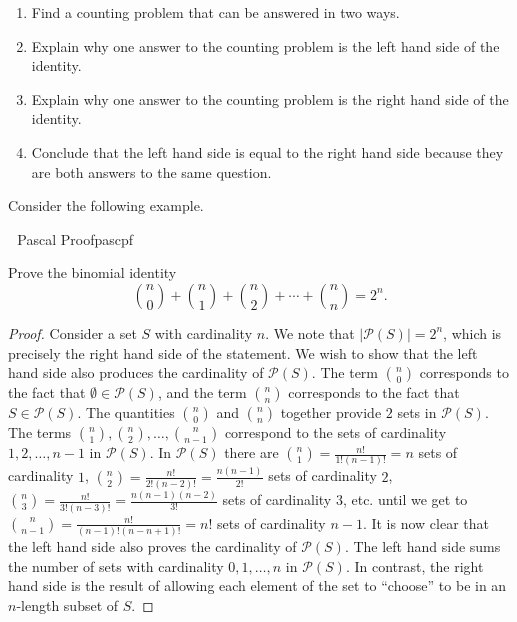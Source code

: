     \begin{enumerate}
        \item Find a counting problem that can be answered in two ways.
        \item Explain why one answer to the counting problem is the left hand side of the identity.
        \item Explain why one answer to the counting problem is the right hand side of the identity.
        \item Conclude that the left hand side is equal to the right hand side because they are both answers to the same question.
    \end{enumerate}
    Consider the following example.
    \begin{example}{\Difficulty\,\Difficulty\,\Difficulty\,\,Pascal Proof}{pascpf}
    
        Prove the binomial identity
        \begin{equation*}
            \binom{n}{0}+\binom{n}{1}+\binom{n}{2}+\cdots+\binom{n}{n}=2^n.
        \end{equation*}
        \begin{proof}
            Consider a set \(S\) with cardinality \(n\). We note that \(|\mathcal{P}(S)|=2^n\), which is precisely the right hand side of the statement. We wish to show that the left hand side also produces the cardinality of \(\mathcal{P}(S)\). The term \(\binom{n}{0}\) corresponds to the fact that \(\emptyset\in\mathcal{P}(S)\), and the term \(\binom{n}{n}\) corresponds to the fact that \(S\in\mathcal{P}(S)\). The quantities \(\binom{n}{0}\) and \(\binom{n}{n}\) together provide \(2\) sets in \(\mathcal{P}(S)\). The terms \(\binom{n}{1},\binom{n}{2},\ldots,\binom{n}{n-1}\) correspond to the sets of cardinality \(1,2,\ldots,n-1\) in \(\mathcal{P}(S)\). In \(\mathcal{P}(S)\) there are \(\binom{n}{1}=\frac{n!}{1!(n-1)!}=n\) sets of cardinality \(1\), \(\binom{n}{2}=\frac{n!}{2!(n-2)!}=\frac{n(n-1)}{2!}\) sets of cardinality \(2\), \(\binom{n}{3}=\frac{n!}{3!(n-3)!}=\frac{n(n-1)(n-2)}{3!}\) sets of cardinality \(3\), etc. until we get to \(\binom{n}{n-1}=\frac{n!}{(n-1)!(n-n+1)!}=n!\) sets of cardinality \(n-1\). It is now clear that the left hand side also proves the cardinality of \(\mathcal{P}(S)\). The left hand side sums the number of sets with cardinality \(0,1,\ldots,n\) in \(\mathcal{P}(S)\). In contrast, the right hand side is the result of allowing each element of the set to ``choose'' to be in an \(n\)-length subset of \(S\).
        \end{proof}
    
    \end{example}
